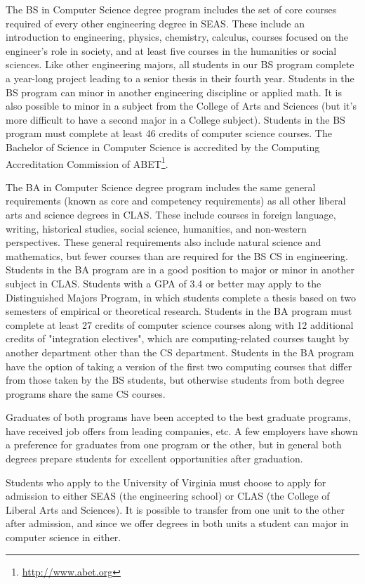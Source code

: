 \documentclass[10pt,letter,twocolumn]{book}
\newcommand{\myurl}[1]{\footnote{\scriptsize\url{#1}}}
\begin{document}
The BS in Computer Science degree program includes the set of core
courses required of every other engineering degree in SEAS. These
include an introduction to engineering, physics, chemistry, calculus,
courses focused on the engineer's role in society, and at least five
courses in the humanities or social sciences. Like other engineering
majors, all students in our BS program complete a year-long project
leading to a senior thesis in their fourth year. Students in the BS
program can minor in another engineering discipline or applied
math. It is also possible to minor in a subject from the College of
Arts and Sciences (but it's more difficult to have a second major in a
College subject). Students in the BS program must complete at least 46
credits of computer science courses. The Bachelor of Science in
Computer Science is accredited by the Computing Accreditation
Commission of ABET\myurl{http://www.abet.org}.

The BA in Computer Science degree program includes the same general
requirements (known as core and competency requirements) as all other
liberal arts and science degrees in CLAS. These include courses in
foreign language, writing, historical studies, social science,
humanities, and non-western perspectives. These general requirements
also include natural science and mathematics, but fewer courses than
are required for the BS CS in engineering. Students in the BA program
are in a good position to major or minor in another subject in
CLAS. Students with a GPA of 3.4 or better may apply to the
Distinguished Majors Program, in which students complete a thesis
based on two semesters of empirical or theoretical research. Students
in the BA program must complete at least 27 credits of computer
science courses along with 12 additional credits of "integration
electives", which are computing-related courses taught by another
department other than the CS department. Students in the BA program
have the option of taking a version of the first two computing courses
that differ from those taken by the BS students, but otherwise
students from both degree programs share the same CS courses.

Graduates of both programs have been accepted to the best graduate
programs, have received job offers from leading companies, etc. A few
employers have shown a preference for graduates from one program or
the other, but in general both degrees prepare students for excellent
opportunities after graduation.

Students who apply to the University of Virginia must choose to apply
for admission to either SEAS (the engineering school) or CLAS (the
College of Liberal Arts and Sciences). It is possible to transfer from
one unit to the other after admission, and since we offer degrees in
both units a student can major in computer science in either.
\end{document}
